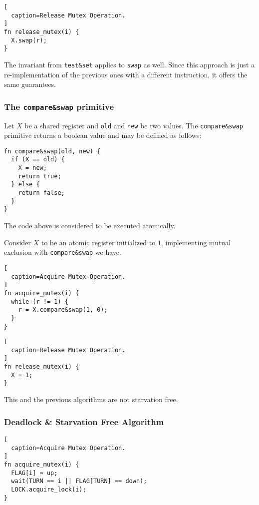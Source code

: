\begin{lstlisting}[
  caption=Release Mutex Operation.
]
fn release_mutex(i) {
  X.swap(r);
}
\end{lstlisting}

The invariant from \texttt{test\&set} applies to \texttt{swap} as well.
Since this approach is just a re-implementation of the previous ones with a different instruction,
it offers the same guarantees.

\subsubsection{The \texttt{compare\&swap} primitive}

Let $X$ be a shared register and \texttt{old} and \texttt{new} be two values.
The \texttt{compare\&swap} primitive returns a boolean value and may be defined as follows:

\begin{lstlisting}[caption=\texttt{compare\&swap} implementation.]
fn compare&swap(old, new) {
  if (X == old) {
    X = new;
    return true;
  } else {
    return false;
  }
}
\end{lstlisting}

The code above is considered to be executed atomically.

Consider $X$ to be an atomic register initialized to $1$,
implementing mutual exclusion with \texttt{compare\&swap} we have.

\begin{lstlisting}[
  caption=Acquire Mutex Operation.
]
fn acquire_mutex(i) {
  while (r != 1) {
    r = X.compare&swap(1, 0);
  }
}
\end{lstlisting}

\begin{lstlisting}[
  caption=Release Mutex Operation.
]
fn release_mutex(i) {
  X = 1;
}
\end{lstlisting}

This and the previous algorithms are not starvation free.

\subsubsection{Deadlock \& Starvation Free Algorithm}

\begin{lstlisting}[
  caption=Acquire Mutex Operation.
]
fn acquire_mutex(i) {
  FLAG[i] = up;
  wait(TURN == i || FLAG[TURN] == down);
  LOCK.acquire_lock(i);
}
\end{lstlisting}

